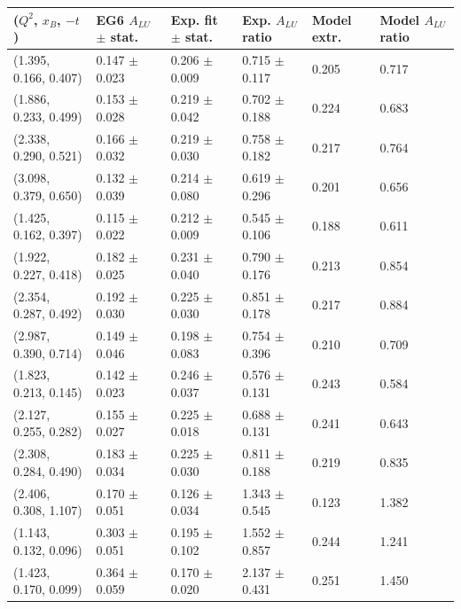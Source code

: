 \small
\begin{landscape}
\begin{table}[!h]
   \begin{center}
      \begin{tabular}{||l|l|l|l|l|l||}
         \hline
 ($Q^{2}$, $x_{B}$, $-t$) & EG6 $A_{LU}$ $\pm$ stat. &  Exp. fit $\pm$ stat. & Exp. $A_{LU}$ ratio   &  Model extr. & Model $A_{LU}$ ratio \\
  \hline
 (1.395, 0.166, 0.407) & 0.147 $\pm$ 0.023 & 0.206 $\pm$ 0.009 & 0.715 $\pm$ 0.117 & 0.205 & 0.717 \\
 (1.886, 0.233, 0.499) & 0.153 $\pm$ 0.028 & 0.219 $\pm$ 0.042 & 0.702 $\pm$ 0.188 & 0.224 & 0.683 \\
 (2.338, 0.290, 0.521) & 0.166 $\pm$ 0.032 & 0.219 $\pm$ 0.030 & 0.758 $\pm$ 0.182 & 0.217 & 0.764 \\
 (3.098, 0.379, 0.650) & 0.132 $\pm$ 0.039 & 0.214 $\pm$ 0.080 & 0.619 $\pm$ 0.296 & 0.201 & 0.656 \\
   \hline \hline  \hline                                                                     
 (1.425, 0.162, 0.397) & 0.115 $\pm$ 0.022 & 0.212 $\pm$ 0.009 & 0.545 $\pm$ 0.106 & 0.188 & 0.611 \\
 (1.922, 0.227, 0.418) & 0.182 $\pm$ 0.025 & 0.231 $\pm$ 0.040 & 0.790 $\pm$ 0.176 & 0.213 & 0.854 \\
 (2.354, 0.287, 0.492) & 0.192 $\pm$ 0.030 & 0.225 $\pm$ 0.030 & 0.851 $\pm$ 0.178 & 0.217 & 0.884 \\
 (2.987, 0.390, 0.714) & 0.149 $\pm$ 0.046 & 0.198 $\pm$ 0.083 & 0.754 $\pm$ 0.396 & 0.210 & 0.709 \\
   \hline  \hline  \hline                                                                    
 (1.823, 0.213, 0.145) & 0.142 $\pm$ 0.023 & 0.246 $\pm$ 0.037 & 0.576 $\pm$ 0.131 & 0.243 & 0.584 \\
 (2.127, 0.255, 0.282) & 0.155 $\pm$ 0.027 & 0.225 $\pm$ 0.018 & 0.688 $\pm$ 0.131 & 0.241 & 0.643 \\
 (2.308, 0.284, 0.490) & 0.183 $\pm$ 0.034 & 0.225 $\pm$ 0.030 & 0.811 $\pm$ 0.188 & 0.219 & 0.835 \\
 (2.406, 0.308, 1.107) & 0.170 $\pm$ 0.051 & 0.126 $\pm$ 0.034 & 1.343 $\pm$ 0.545 & 0.123 & 1.382 \\
   \hline  \hline  \hline                                                                    
 (1.143, 0.132, 0.096) & 0.303 $\pm$ 0.051 & 0.195 $\pm$ 0.102 & 1.552 $\pm$ 0.857 & 0.244 & 1.241 \\
 (1.423, 0.170, 0.099) & 0.364 $\pm$ 0.059 & 0.170 $\pm$ 0.020 & 2.137 $\pm$ 0.431 & 0.251 & 1.450 \\

\end{tabular}
\end{center}
\end{table}
\end{landscape}
